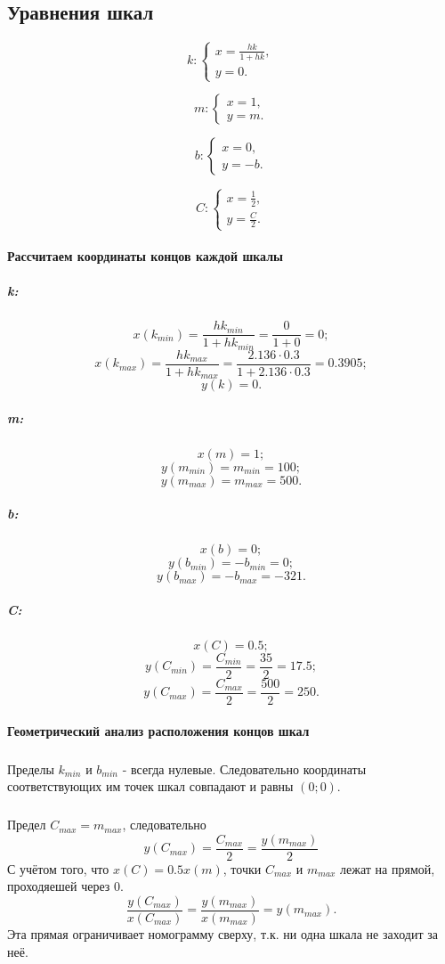 \subsection{Уравнения шкал}

$$k: \left\{
\begin{array}{l}
	x = \frac{hk}{1+hk},\\
	y = 0.
\end{array}
\right.
$$

$$m: \left\{
\begin{array}{l}
	x = 1,\\
	y = m.
\end{array}
\right.
$$

$$b: \left\{
\begin{array}{l}
	x = 0,\\
	y = -b.
\end{array}
\right.
$$

$$
C: \left\{
\begin{array}{l}
	x = \frac{1}{2}, \\
	y = \frac{C}{2}.
\end{array}
\right.
$$

\paragraph{Рассчитаем координаты концов каждой шкалы}
\subparagraph{k:}
$$x(k_{min}) = \frac{hk_{min}}{1+hk_{min}} = \frac{0}{1+0} = 0;$$
$$x(k_{max}) = \frac{h k_{max}}{1+h k_{max}} = \frac{2.136 \cdot 0.3}{1 + 2.136 \cdot 0.3} = 0.3905;$$
$$y(k) = 0.$$

\subparagraph{m:}
$$x(m) = 1;$$
$$y(m_{min}) = m_{min} = 100;$$
$$y(m_{max}) = m_{max} = 500.$$

\subparagraph{b:}
$$x(b) = 0;$$
$$y(b_{min}) = -b_{min} = 0;$$
$$y(b_{max}) = -b_{max} = -321.$$

\subparagraph{C:}
$$x(C) = 0.5;$$
$$y(C_{min}) = \frac{C_{min}}{2} = \frac{35}{2} = 17.5;$$
$$y(C_{max}) = \frac{C_{max}}{2} = \frac{500}{2} = 250.$$

\paragraph{Геометрический анализ расположения концов шкал}
\subparagraph{}Пределы $k_{min}$ и $b_{min}$ - всегда нулевые. Следовательно координаты соответствующих им точек шкал совпадают и равны $(0; 0)$.
\subparagraph{}Предел $C_{max} = m_{max}$, следовательно
$$y(C_{max}) = \frac{C_{max}}{2} =\frac{y(m_{max})}{2}$$
С учётом того, что $x(C) = 0.5 x(m)$, точки $C_{max}$ и $m_{max}$ лежат на прямой, проходяешей через 0.
$$\frac{y(C_{max})}{x(C_{max})} = \frac{y(m_{max})}{x(m_{max})} = y(m_{max}).$$
Эта прямая ограничивает номограмму сверху, т.к. ни одна шкала не заходит за неё.

